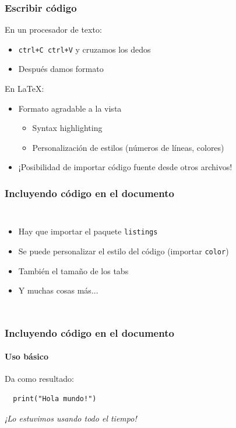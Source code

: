 \documentclass[svgnames]{beamer}
\begin{document}
\begin{frame}
  \frametitle{Escribir código}
  En un procesador de texto: 
  \begin{itemize}
    \item \texttt{ctrl+C ctrl+V} y cruzamos los dedos
    \item Después damos formato
  \end{itemize}\pause
  En \LaTeX:
  \begin{itemize}
    \item Formato agradable a la vista
    \begin{itemize}
      \item Syntax highlighting
      \item Personalización de estilos (números de líneas, colores)
    \end{itemize}
    \item ¡Posibilidad de importar código fuente desde otros archivos!
  \end{itemize}
\end{frame}

\begin{frame}
  \frametitle{Incluyendo código en el documento}
  \begin{columns}
    \centering
      
    \centering
      \begin{itemize}
        \item Hay que importar el paquete \texttt{listings}
        \item Se puede personalizar el estilo del código (importar \texttt{color})
        \item También el tamaño de los tabs
        \item Y muchas cosas más...
      \end{itemize}
  \end{columns}
\end{frame}


\begin{frame}[fragile]
  \frametitle{Incluyendo código en el documento}
  \framesubtitle{Uso básico}
  

  \vfill

  Da como resultado:
  \begin{lstlisting}
  print("Hola mundo!")
  \end{lstlisting}\pause

  \vfill

  \begin{center}
    \emph{¡Lo estuvimos usando todo el tiempo!}
  \end{center}
\end{frame}
\end{document}
